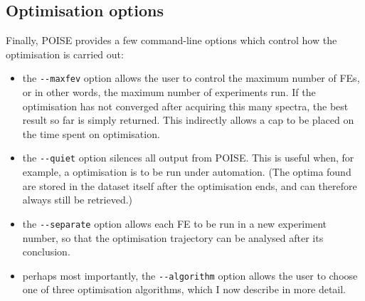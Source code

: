\subsection{Optimisation options}
\label{subsec:poise__options}

Finally, POISE provides a few command-line options which control how the optimisation is carried out:

\begin{itemize}
    \item the \texttt{-\phantom{}-maxfev} option allows the user to control the maximum number of FEs, or in other words, the maximum number of experiments run.
        If the optimisation has not converged after acquiring this many spectra, the best result so far is simply returned.
        This indirectly allows a cap to be placed on the time spent on optimisation.

    \item the \texttt{-\phantom{}-quiet} option silences all output from POISE.
        This is useful when, for example, a optimisation is to be run under automation.
        (The optima found are stored in the dataset itself after the optimisation ends, and can therefore always still be retrieved.)
        
    \item the \texttt{-\phantom{}-separate} option allows each FE to be run in a new experiment number, so that the optimisation trajectory can be analysed after its conclusion.

    \item perhaps most importantly, the \texttt{-\phantom{}-algorithm} option allows the user to choose one of three optimisation algorithms, which I now describe in more detail.
\end{itemize}
